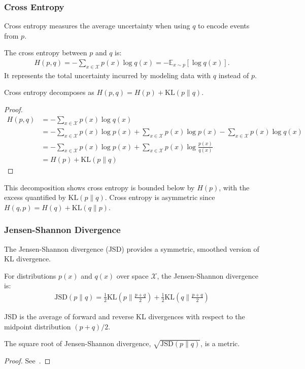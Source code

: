 \subsubsection{Cross Entropy}
Cross entropy measures the average uncertainty when using $q$ to encode events from $p$.
\begin{definition}
	The \textnormal{\sffamily cross entropy} between $p$ and $q$ is:
	\begin{align}
		H(p, q) = - \sum_{x \in \mathcal{X}} p(x) \log q(x) = -\mathbb{E}_{x \sim p}\left[\log{q(x)}\right].
	\end{align}
	It represents the total uncertainty incurred by modeling data with $q$ instead of $p$.
\end{definition}
\begin{lemma}
	Cross entropy decomposes as $H(p, q) = H(p) + \text{KL}(p \| q)$.
\end{lemma}
\begin{proof}
	\begin{align}
		H(p, q) & = -\sum_{x \in \mathcal{X}} p(x) \log q(x)                                                                                     \\
		        & = -\sum_{x \in \mathcal{X}} p(x) \log p(x) + \sum_{x \in \mathcal{X}} p(x) \log p(x) - \sum_{x \in \mathcal{X}} p(x) \log q(x) \\
		        & = -\sum_{x \in \mathcal{X}} p(x) \log p(x) + \sum_{x \in \mathcal{X}} p(x) \log \frac{p(x)}{q(x)}                              \\
		        & = H(p) + \text{KL}(p \| q)
	\end{align}
\end{proof}
This decomposition shows cross entropy is bounded below by $H(p)$, with the excess quantified by $\text{KL}(p \| q)$. Cross entropy is asymmetric since $H(q, p) = H(q) + \text{KL}(q \| p)$.
\subsubsection{Jensen-Shannon Divergence}
The Jensen-Shannon divergence (JSD) provides a symmetric, smoothed version of KL divergence.
\begin{definition}%
	\label{def:jsd}
	For distributions $p(x)$ and $q(x)$ over space $\mathcal{X}$, the \textnormal{\sffamily Jensen-Shannon divergence} is:
	\begin{align}
		\text{JSD}(p \| q) = \frac{1}{2} \text{KL}\left(p \| \frac{p + q}{2}\right) + \frac{1}{2} \text{KL}\left(q \| \frac{p + q}{2}\right)
	\end{align}
\end{definition}
\begin{remark}
	JSD is the average of forward and reverse KL divergences with respect to the midpoint distribution $(p+q)/2$.
\end{remark}
\begin{theorem}
	The square root of Jensen-Shannon divergence, $\sqrt{\text{JSD}(p \| q)}$, is a metric.
\end{theorem}
\begin{proof}
	See~\cite{ref:endres-2003}.
\end{proof}
